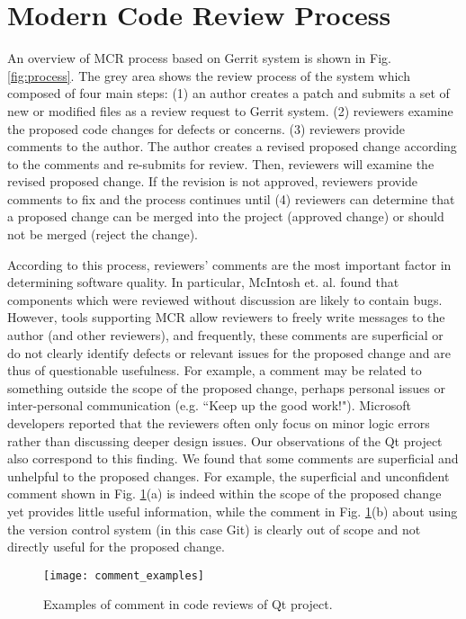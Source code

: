 

\section{Modern Code Review Process}

An overview of MCR process based on Gerrit system is shown in Fig. \ref{fig:process}.
The grey area shows the review process of the system which composed of four main steps:
(1) an author creates a patch and submits a set of new or modified files as a review request to Gerrit system.
(2) reviewers examine the proposed code changes for defects or concerns.
(3) reviewers provide comments to the author. The author creates a revised proposed change according to the comments and re-submits for review. Then, reviewers will examine the revised proposed change. If the revision is not approved, reviewers provide comments to fix and the process continues until (4) reviewers can determine that a proposed change can be merged into the project (approved change) or should not be merged (reject the change). 


According to this process, reviewers' comments are the most important factor in determining software quality.
In particular, McIntosh et. al. \cite{Mcintosh} found that components which were reviewed without discussion are likely to contain bugs.
However, tools supporting MCR allow reviewers to freely write messages to the author (and other reviewers), and frequently, these comments are superficial or do not clearly identify defects or relevant issues for the proposed change and are thus of questionable usefulness.
For example, a comment may be related to something outside the scope of the proposed change, perhaps personal issues or inter-personal communication (e.g. ``Keep up the good work!").
Microsoft developers reported that the reviewers often only focus on minor logic errors rather than discussing deeper design\cite{Bacchelli2013a} issues.
Our observations of the Qt project also correspond to this finding.
We found that some comments are superficial and unhelpful to the proposed changes.
For example, the superficial and unconfident comment shown in Fig. \ref{fig:example}(a) is indeed within the scope of the proposed change yet provides little useful information,
while the comment in Fig. \ref{fig:example}(b) about using the version control system (in this case Git) is clearly out of scope and not directly useful for the proposed change. 



\begin{figure}[!t]
\centering
\texttt{[image: comment\_examples]}
\caption{Examples of comment in code reviews of Qt project.}
\label{fig:example}
\end{figure}
